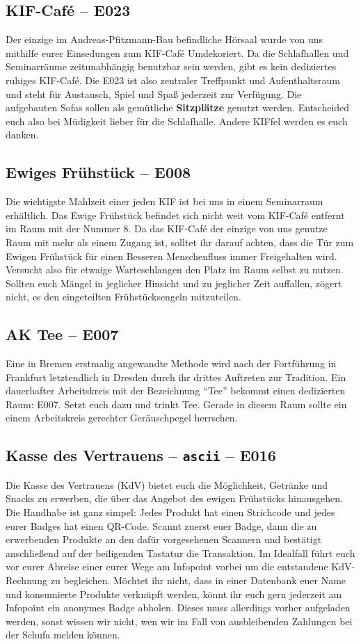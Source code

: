 \subsection*{KIF-Café -- E023}
Der einzige im Andreas-Pfitzmann-Bau befindliche Hörsaal wurde von uns mithilfe eurer Einsedungen zum KIF-Café Umdekoriert.
Da die Schlafhallen und Seminarräume zeitunabhängig benutzbar sein werden, gibt es kein dediziertes ruhiges KIF-Café.
Die E023 ist also zentraler Treffpunkt und Aufenthaltsraum und steht für Austausch, Spiel und Spaß jederzeit zur Verfügung.
Die aufgebauten Sofas sollen als gemütliche \textbf{Sitzplätze} genutzt werden.
Entscheided euch also bei Müdigkeit lieber für die Schlafhalle.
Andere KIFfel werden es euch danken.

\subsection*{Ewiges Frühstück -- E008}
Die wichtigste Mahlzeit einer jeden KIF ist bei uns in einem Seminarraum erhältlich.
Das Ewige Frühstück befindet sich nicht weit vom KIF-Café entfernt im Raum mit der Nummer 8.
Da das KIF-Café der einzige von uns genutze Raum mit mehr als einem Zugang ist, solltet ihr darauf achten, dass die Tür zum Ewigen Frühstück für einen Besseren Menschenfluss immer Freigehalten wird.
Versucht also für etwaige Warteschlangen den Platz im Raum selbst zu nutzen.
Sollten euch Mängel in jeglicher Hinsicht und zu jeglicher Zeit auffallen, zögert nicht, es den eingeteilten Frühstücksengeln mitzuteilen.

\subsection*{AK Tee -- E007}
Eine in Bremen erstmalig angewandte Methode wird nach der Fortführung in Frankfurt letztendlich in Dresden durch ihr drittes Auftreten zur Tradition.
Ein dauerhafter Arbeitskreis mit der Bezeichnung \enquote{Tee} bekommt einen dedizierten Raum: E007.
Setzt euch dazu und trinkt Tee.
Gerade in diesem Raum sollte ein einem Arbeitskreis gerechter Geräuschpegel herrschen.

\subsection*{Kasse des Vertrauens -- \texttt{ascii} -- E016}
Die Kasse des Vertrauens (KdV) bietet euch die Möglichkeit, Getränke und Snacks zu erwerben, die über das Angebot des ewigen Frühstücks hinausgehen.
Die Handhabe ist ganz simpel: Jedes Produkt hat einen Strichcode und jedes eurer Badges hat einen QR-Code.
Scannt zuerst euer Badge, dann die zu erwerbenden Produkte an den dafür vorgesehenen Scannern und bestätigt anschließend auf der beiligenden Tastatur die Transaktion.
Im Idealfall führt euch vor eurer Abreise einer eurer Wege am Infopoint vorbei um die entstandene KdV-Rechnung zu begleichen.
Möchtet ihr nicht, dass in einer Datenbank euer Name und konsumierte Produkte verknüpft werden, könnt ihr euch gern jederzeit am Infopoint ein anonymes Badge abholen.
Dieses muss allerdings vorher aufgeladen werden, sonst wissen wir nicht, wen wir im Fall von ausbleibenden Zahlungen bei der Schufa melden können.

